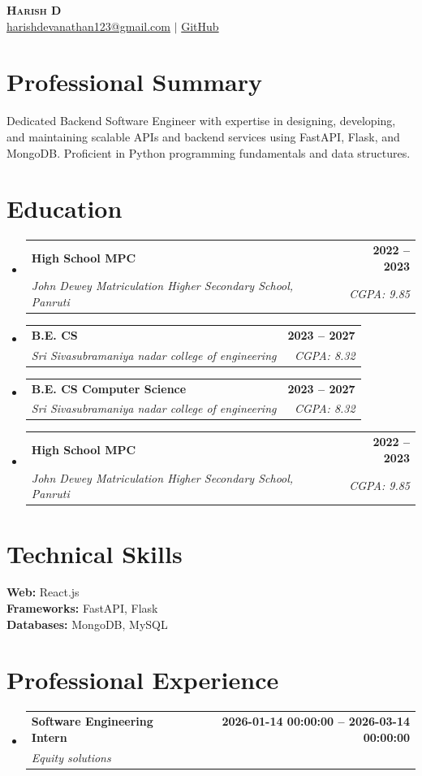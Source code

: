 \documentclass[a4paper,10pt]{article}
\makeatletter
\newcommand{\resumeSubheading}[4]{
  \vspace{-1pt}\item
    \begin{tabular*}{0.97\textwidth}[t]{l@{\extracolsep{\fill}}r}
      \textbf{#1} & \textbf{#2} \\
      \textit{\small#3} & \textit{\small #4} \\
    \end{tabular*}\vspace{-5pt}
}
\newcommand{\resumeSubHeadingListStart}{\begin{itemize}[leftmargin=0.15in, label={}]}
\newcommand{\resumeSubHeadingListEnd}{\end{itemize}}
\makeatother
\begin{document}
\begin{center}
  {\Huge\bfseries\scshape Harish D} \\[8pt]
  \small
  \href{mailto:harishdevanathan123@gmail.com}{harishdevanathan123@gmail.com}%
   $|$ \href{HarishDevanathan}{GitHub}%
  \end{center}

\vspace{8pt}

\section{Professional Summary}
\small{Dedicated Backend Software Engineer with expertise in designing, developing, and maintaining scalable APIs and backend services using FastAPI, Flask, and MongoDB. Proficient in Python programming fundamentals and data structures.}
\vspace{6pt}

\section{Education}
\resumeSubHeadingListStart
  \resumeSubheading
    {High School MPC}{2022 -- 2023}
    {John Dewey Matriculation Higher Secondary School, Panruti}{CGPA: 9.85}
  \resumeSubheading
    {B.E. CS}{2023 -- 2027}
    {Sri Sivasubramaniya nadar college of engineering}{CGPA: 8.32}
  \resumeSubheading
    {B.E. CS Computer Science}{2023 -- 2027}
    {Sri Sivasubramaniya nadar college of engineering}{CGPA: 8.32}
  \resumeSubheading
    {High School MPC}{2022 -- 2023}
    {John Dewey Matriculation Higher Secondary School, Panruti}{CGPA: 9.85}
\resumeSubHeadingListEnd
\vspace{4pt}

\section{Technical Skills}
\small{
    \textbf{Web:} React.js \\
    \textbf{Frameworks:} FastAPI, Flask \\
    \textbf{Databases:} MongoDB, MySQL \\
  }
\vspace{6pt}

\section{Professional Experience}
\resumeSubHeadingListStart
  \resumeSubheading
    {Software Engineering Intern}{2026-01-14 00:00:00 -- 2026-03-14 00:00:00}
    {Equity solutions}{}
    \resumeSubHeadingListEnd
\vspace{4pt}
\end{document}
